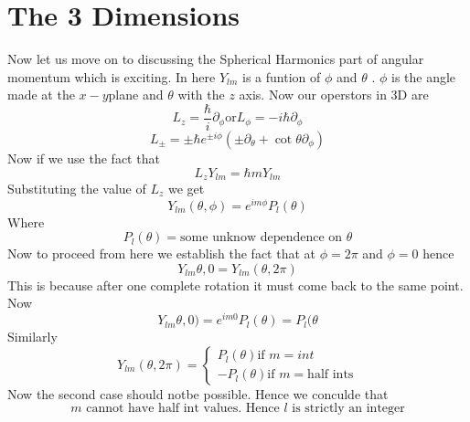 \documentclass{article}
\begin{document}
\section{The 3 Dimensions}
Now let us move on to discussing the Spherical Harmonics part of angular momentum which is exciting. 
In here $Y_{lm}$ is a funtion of $\phi$ and $\theta$ . $\phi$ is the angle made at the $x-y$plane and $\theta$ with the $z$ axis. 
Now our operstors in 3D are
\begin{equation}
L_z=\frac{\hbar }{i}\partial_\phi \text{or} L_\phi=-i\hbar\partial_\phi
\end{equation}
\begin{equation}
L_{\pm}={\pm}\hbar e^{{\pm}i\phi}(\pm \partial_\theta + \cot{\theta}\partial_{\phi})
\end{equation}
Now  if we use the fact that 
\begin{equation}
L_zY_{lm}=\hbar mY_{lm}
\end{equation}
Substituting the value of $L_z$ we get 
\begin{equation}
Y_{lm}(\theta,\phi)=e^{im\phi}P_{l}(\theta)
\end{equation}
Where 
\begin{equation}
P_l(\theta)=\text{some unknow dependence on $\theta$}
\end{equation}
Now to proceed from here we establish the fact that at $\phi=2\pi$ and $\phi=0$ hence 
\begin{equation}
Y_{lm}{\theta,0 }=Y_{lm}(\theta,2\pi)
\end{equation}
This is because after one complete rotation it must come back to the same point. 
Now 
\begin{equation}
Y_{lm}{\theta,0)=e^{im0}P_l(\theta) = P_l(\theta}
\end{equation}
Similarly 
\begin{equation}
Y_{lm}(\theta,2\pi)=
\begin{cases}
P_l(\theta) \text{if $m=int$}
\\
-P_l(\theta) \text{if $m=$half ints}
\end{cases}
\end{equation}
Now the second case should notbe possible. Hence we conculde that 
\begin{equation}
\text{$m$ cannot have half int values. Hence $l$ is strictly an integer}
\end{equation}
\end{document}
